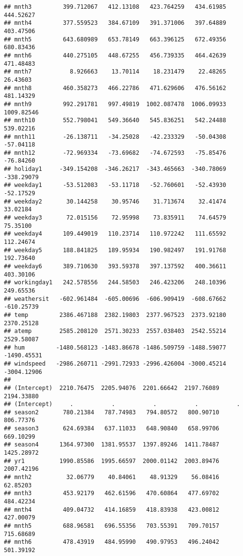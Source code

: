 \documentclass[]{article}
\begin{document}
\begin{verbatim}
## mnth3         399.712067   412.13108   423.764259   434.61985   444.52627
## mnth4         377.559523   384.67109   391.371006   397.64889   403.47506
## mnth5         643.680989   653.78149   663.396125   672.49356   680.83436
## mnth6         440.275105   448.67255   456.739335   464.42639   471.48483
## mnth7           8.926663    13.70114    18.231479    22.48265    26.43603
## mnth8         460.358273   466.22786   471.629606   476.56162   481.14329
## mnth9         992.291781   997.49819  1002.087478  1006.09933  1009.82546
## mnth10        552.798041   549.36640   545.836251   542.24488   539.02216
## mnth11        -26.138711   -34.25028   -42.233329   -50.04308   -57.04118
## mnth12        -72.969334   -73.69682   -74.672593   -75.85476   -76.84260
## holiday1     -349.154208  -346.26217  -343.465663  -340.78069  -338.29079
## weekday1      -53.512083   -53.11718   -52.760601   -52.43930   -52.17529
## weekday2       30.144258    30.95746    31.713674    32.41474    33.02184
## weekday3       72.015156    72.95998    73.835911    74.64579    75.35100
## weekday4      109.449019   110.23714   110.972242   111.65592   112.24674
## weekday5      188.841825   189.95934   190.982497   191.91768   192.73640
## weekday6      389.710630   393.59378   397.137592   400.36611   403.30106
## workingday1   242.578556   244.58503   246.423206   248.10396   249.65536
## weathersit   -602.961484  -605.00696  -606.909419  -608.67662  -610.25739
## temp         2386.467188  2382.19803  2377.967523  2373.92180  2370.25128
## atemp        2585.208120  2571.30233  2557.038403  2542.55214  2529.58087
## hum         -1480.568123 -1483.86678 -1486.509759 -1488.59077 -1490.45531
## windspeed   -2986.260711 -2991.72933 -2996.426004 -3000.45214 -3004.12906
##                                                                        
## (Intercept)  2210.76475  2205.94076  2201.66642  2197.76089  2194.33880
## (Intercept)     .           .           .           .           .      
## season2       780.21384   787.74983   794.80572   800.90710   806.77376
## season3       624.69384   637.11033   648.90840   658.99706   669.10299
## season4      1364.97300  1381.95537  1397.89246  1411.78487  1425.28972
## yr1          1990.85586  1995.66597  2000.01142  2003.89476  2007.42196
## mnth2          32.06779    40.84061    48.91329    56.08416    62.85203
## mnth3         453.92179   462.61596   470.60864   477.69702   484.42234
## mnth4         409.04732   414.16859   418.83938   423.00812   427.00079
## mnth5         688.96581   696.55356   703.55391   709.70157   715.68689
## mnth6         478.43919   484.95990   490.97953   496.24042   501.39192

\end{verbatim}
\end{document}

